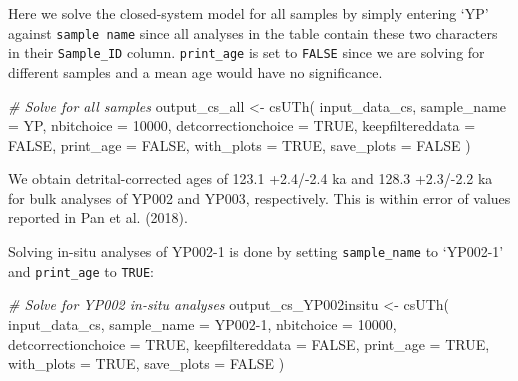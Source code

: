 \documentclass[]{elsarticle} %
\newenvironment{Shaded}{\begin{snugshade}}{\end{snugshade}}
\newcommand{\AttributeTok}[1]{\textcolor[rgb]{0.77,0.63,0.00}{#1}}
\newcommand{\CommentTok}[1]{\textcolor[rgb]{0.56,0.35,0.01}{\textit{#1}}}
\newcommand{\ConstantTok}[1]{\textcolor[rgb]{0.00,0.00,0.00}{#1}}
\newcommand{\DecValTok}[1]{\textcolor[rgb]{0.00,0.00,0.81}{#1}}
\newcommand{\FunctionTok}[1]{\textcolor[rgb]{0.00,0.00,0.00}{#1}}
\newcommand{\NormalTok}[1]{#1}
\newcommand{\OtherTok}[1]{\textcolor[rgb]{0.56,0.35,0.01}{#1}}
\newcommand{\StringTok}[1]{\textcolor[rgb]{0.31,0.60,0.02}{#1}}
\begin{document}
Here we solve the closed-system model for all samples by simply entering `YP' against \texttt{sample\ name} since all analyses in the table contain these two characters in their \texttt{Sample\_ID} column. \texttt{print\_age} is set to \texttt{FALSE} since we are solving for different samples and a mean age would have no significance.

\begin{Shaded}
\begin{Highlighting}[]
\CommentTok{\# Solve for all samples}
\NormalTok{output\_cs\_all }\OtherTok{\textless{}{-}}
  \FunctionTok{csUTh}\NormalTok{(}
\NormalTok{    input\_data\_cs,}
    \AttributeTok{sample\_name =} \StringTok{\textquotesingle{}YP\textquotesingle{}}\NormalTok{,}
    \AttributeTok{nbitchoice =} \DecValTok{10000}\NormalTok{,}
    \AttributeTok{detcorrectionchoice =} \ConstantTok{TRUE}\NormalTok{,}
    \AttributeTok{keepfiltereddata =} \ConstantTok{FALSE}\NormalTok{,}
    \AttributeTok{print\_age =} \ConstantTok{FALSE}\NormalTok{,}
    \AttributeTok{with\_plots =} \ConstantTok{TRUE}\NormalTok{,}
    \AttributeTok{save\_plots =} \ConstantTok{FALSE}
\NormalTok{  )}
\end{Highlighting}
\end{Shaded}

We obtain detrital-corrected ages of 123.1 +2.4/-2.4 ka and 128.3 +2.3/-2.2 ka for bulk analyses of YP002 and YP003, respectively. This is within error of values reported in Pan et al. (2018).

Solving in-situ analyses of YP002-1 is done by setting \texttt{sample\_name} to `YP002-1' and \texttt{print\_age} to \texttt{TRUE}:

\begin{Shaded}
\begin{Highlighting}[]
\CommentTok{\# Solve for YP002 in{-}situ analyses}
\NormalTok{output\_cs\_YP002insitu }\OtherTok{\textless{}{-}}
  \FunctionTok{csUTh}\NormalTok{(}
\NormalTok{    input\_data\_cs,}
    \AttributeTok{sample\_name =} \StringTok{\textquotesingle{}YP002{-}1\textquotesingle{}}\NormalTok{,}
    \AttributeTok{nbitchoice =} \DecValTok{10000}\NormalTok{,}
    \AttributeTok{detcorrectionchoice =} \ConstantTok{TRUE}\NormalTok{,}
    \AttributeTok{keepfiltereddata =} \ConstantTok{FALSE}\NormalTok{,}
    \AttributeTok{print\_age =} \ConstantTok{TRUE}\NormalTok{,}
    \AttributeTok{with\_plots =} \ConstantTok{TRUE}\NormalTok{,}
    \AttributeTok{save\_plots =} \ConstantTok{FALSE}
\NormalTok{  )}
\end{Highlighting}
\end{Shaded}
\end{document}
